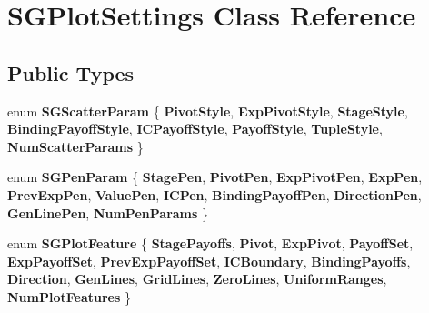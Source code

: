 \hypertarget{classSGPlotSettings}{}\section{S\+G\+Plot\+Settings Class Reference}
\label{classSGPlotSettings}
\subsection*{Public Types}
\begin{DoxyCompactItemize}
\item 
\mbox{\label{classSGPlotSettings_a76b5597519c9cc9fa3f7b3ee24c28d39}} 
enum {\bfseries S\+G\+Scatter\+Param} \{ \newline
{\bfseries Pivot\+Style}, 
{\bfseries Exp\+Pivot\+Style}, 
{\bfseries Stage\+Style}, 
{\bfseries Binding\+Payoff\+Style}, 
\newline
{\bfseries I\+C\+Payoff\+Style}, 
{\bfseries Payoff\+Style}, 
{\bfseries Tuple\+Style}, 
{\bfseries Num\+Scatter\+Params}
 \}
\item 
\mbox{\label{classSGPlotSettings_ae655b3b1e012fcb780d4ed541a725f05}} 
enum {\bfseries S\+G\+Pen\+Param} \{ \newline
{\bfseries Stage\+Pen}, 
{\bfseries Pivot\+Pen}, 
{\bfseries Exp\+Pivot\+Pen}, 
{\bfseries Exp\+Pen}, 
\newline
{\bfseries Prev\+Exp\+Pen}, 
{\bfseries Value\+Pen}, 
{\bfseries I\+C\+Pen}, 
{\bfseries Binding\+Payoff\+Pen}, 
\newline
{\bfseries Direction\+Pen}, 
{\bfseries Gen\+Line\+Pen}, 
{\bfseries Num\+Pen\+Params}
 \}
\item 
\mbox{\label{classSGPlotSettings_a3e027e0bf85db5184d5d2fe9362e245d}} 
enum {\bfseries S\+G\+Plot\+Feature} \{ \newline
{\bfseries Stage\+Payoffs}, 
{\bfseries Pivot}, 
{\bfseries Exp\+Pivot}, 
{\bfseries Payoff\+Set}, 
\newline
{\bfseries Exp\+Payoff\+Set}, 
{\bfseries Prev\+Exp\+Payoff\+Set}, 
{\bfseries I\+C\+Boundary}, 
{\bfseries Binding\+Payoffs}, 
\newline
{\bfseries Direction}, 
{\bfseries Gen\+Lines}, 
{\bfseries Grid\+Lines}, 
{\bfseries Zero\+Lines}, 
\newline
{\bfseries Uniform\+Ranges}, 
{\bfseries Num\+Plot\+Features}
 \}
\end{DoxyCompactItemize}
